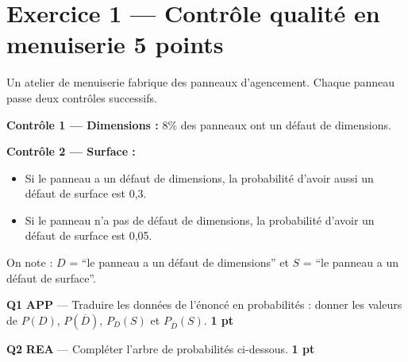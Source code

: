 \documentclass[a4paper,11pt]{article}
\newcommand{\pts}[1]{\hfill\textcolor{gris}{\small\textbf{#1}}}
\newcommand{\comp}[1]{\colorbox{blue!10}{\scriptsize\textbf{#1}}}
\begin{document}
\newpage

\section*{Exercice 1 — Contrôle qualité en menuiserie \pts{5 points}}

\begin{contextebox}
Un atelier de menuiserie fabrique des panneaux d'agencement. Chaque panneau passe deux contrôles successifs.

\textbf{Contrôle 1 — Dimensions :} 8\% des panneaux ont un défaut de dimensions.

\textbf{Contrôle 2 — Surface :}
\begin{itemize}[nosep]
  \item Si le panneau a un défaut de dimensions, la probabilité d'avoir aussi un défaut de surface est 0,3.
  \item Si le panneau n'a pas de défaut de dimensions, la probabilité d'avoir un défaut de surface est 0,05.
\end{itemize}

On note : $D$ = ``le panneau a un défaut de dimensions'' et $S$ = ``le panneau a un défaut de surface''.
\end{contextebox}

\vspace{6pt}

\textbf{Q1} \comp{APP} — Traduire les données de l'énoncé en probabilités : donner les valeurs de $P(D)$, $P(\overline{D})$, $P_D(S)$ et $P_{\overline{D}}(S)$. \pts{1 pt}

\begin{reponsebox}[3cm]
\dotfill

\dotfill

\dotfill
\end{reponsebox}

\textbf{Q2} \comp{REA} — Compléter l'arbre de probabilités ci-dessous. \pts{1 pt}

\begin{center}
\end{center}
\end{document}
